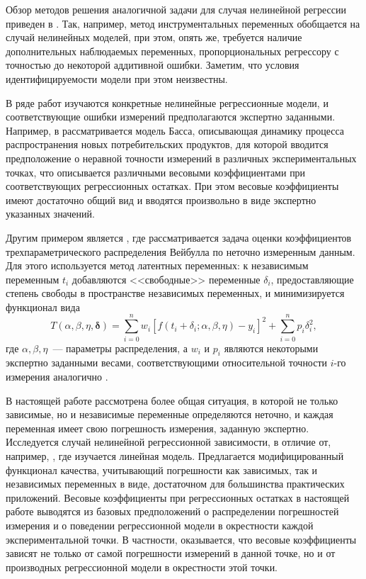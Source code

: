 \documentclass[tikz,10pt,a4paper]{article}
\begin{document}
Обзор методов решения аналогичной задачи для случая нелинейной
регрессии приведен в \cite{Carrol06MeasurementErrors}.
Так, например, метод инструментальных переменных
обобщается на случай нелинейных моделей, при этом,
опять же, требуется наличие дополнительных наблюдаемых переменных,
пропорциональных регрессору с точностью до некоторой аддитивной
ошибки.
Заметим, что условия идентифицируемости модели при этом неизвестны.

В ряде работ изучаются конкретные нелинейные
регрессионные модели, и соответствующие ошибки измерений
предполагаются экспертно заданными.
Например, в \cite{jukic2013nonlinear} рассматривается модель Басса,
описывающая динамику процесса распространения новых потребительских продуктов,
для которой вводится предположение о неравной точности измерений в различных
экспериментальных точках, что описывается различными весовыми коэффициентами при
соответствующих регрессионных остатках. При этом весовые коэффициенты имеют достаточно
общий вид и вводятся произвольно в виде экспертно указанных значений.

Другим примером является \cite{jukic2010nonlinear}, где рассматривается задача оценки коэффициентов
трехпараметрического распределения Вейбулла по неточно измеренным данным.
Для этого используется метод латентных переменных: к
независимым переменным $t_i$ добавляются <<свободные>> переменные $\delta_i$,
предоставляющие степень свободы в пространстве независимых переменных, и минимизируется
функционал вида
\[
  T(\alpha, \beta, \eta, \boldsymbol{\delta}) = \sum_{i = 0}^n w_i [f(t_i + \delta_i; \alpha, \beta, \eta) - y_i]^2 + \sum_{i = 0}^n p_i \delta_i^2,
\]
где $\alpha, \beta, \eta$~--- параметры распределения, а $w_i$ и $p_i$ являются
некоторыми экспертно заданными весами, соответствующими относительной точности
$i$-го измерения аналогично \cite{jukic2013nonlinear}.

В настоящей работе рассмотрена более общая ситуация, в которой не только зависимые,
но и независимые переменные определяются неточно, и каждая переменная
имеет свою погрешность измерения, заданную экспертно.
Исследуется случай
нелинейной регрессионной зависимости, в отличие от, например,
\cite{kiryati2000heteroscedastic}, где изучается линейная модель.
Предлагается модифицированный функционал качества, учитывающий погрешности как
зависимых, так и независимых переменных в виде, достаточном для большинства
практических приложений. Весовые коэффициенты при регрессионных остатках
в настоящей работе выводятся из базовых предположений о распределении
погрешностей измерения и о поведении регрессионной модели в окрестности каждой
экспериментальной точки. В частности, оказывается, что весовые коэффициенты
зависят не только от самой погрешности измерений в данной точке, но и от
производных регрессионной модели в окрестности этой точки.
\end{document}
